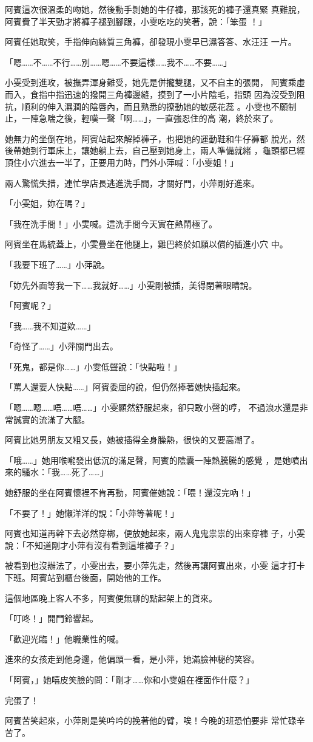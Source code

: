 阿賓這次很溫柔的吻她，然後動手剝她的牛仔褲，那該死的褲子還真緊
真難脫，阿賓費了半天勁才將褲子褪到腳跟，小雯吃吃的笑著，說：「笨蛋
！」

阿賓任她取笑，手指伸向絲質三角褲，卻發現小雯早已濕答答、水汪汪
一片。

「嗯……不……不行……別……嗯……不要這樣……我不……不要……」

小雯受到進攻，被撫弄渾身難受，她先是併攏雙腿，又不自主的張開，
阿賓乘虛而入，食指中指迅速的撥開三角褲邊縫，摸到了一小片陰毛，指頭
因為沒受到阻抗，順利的伸入濕潤的陰唇內，而且熟悉的撩動她的敏感花蕊
。小雯也不願制止，一陣急喘之後，輕嘆一聲「啊……」，一直強忍住的高
潮，終於來了。

她無力的坐倒在地，阿賓站起來解掉褲子，也把她的運動鞋和牛仔褲都
脫光，然後帶她到行軍床上，讓她躺上去，自己壓到她身上，兩人準備就緒
，龜頭都已經頂住小穴進去一半了，正要用力時，門外小萍喊：「小雯姐！」

兩人驚慌失措，連忙學店長逃進洗手間，才關好門，小萍剛好進來。

「小雯姐，妳在嗎？」

「我在洗手間！」小雯喊。這洗手間今天實在熱鬧極了。

阿賓坐在馬統蓋上，小雯疊坐在他腿上，雞巴終於如願以償的插進小穴
中。

「我要下班了……」小萍說。

「妳先外面等我一下……我就好……」小雯剛被插，美得閉著眼睛說。

「阿賓呢？」

「我……我不知道欸……」

「奇怪了……」小萍關門出去。

「死鬼，都是你……」小雯低聲說：「快點啦！」

「罵人還要人快點……」阿賓委屈的說，但仍然捧著她快插起來。

「嗯……嗯……唔……唔……」小雯顯然舒服起來，卻只敢小聲的哼，
不過浪水還是非常誠實的流滿了大腿。

阿賓比她男朋友又粗又長，她被插得全身臊熱，很快的又要高潮了。

「哦……」她用喉嚨發出低沉的滿足聲，阿賓的陰囊一陣熱騰騰的感覺
，是她噴出來的騷水：「我……死了……」

她舒服的坐在阿賓懷裡不肯再動，阿賓催她說：「喂！還沒完吶！」

「不要了！」她懶洋洋的說：「小萍等著呢！」

阿賓也知道再幹下去必然穿梆，便放她起來，兩人鬼鬼祟祟的出來穿褲
子，小雯說：「不知道剛才小萍有沒有看到這堆褲子？」

被看到也沒辦法了，小雯出去，要小萍先走，然後再讓阿賓出來，小雯
這才打卡下班。阿賓站到櫃台後面，開始他的工作。

這個地區晚上客人不多，阿賓便無聊的點起架上的貨來。

「叮咚！」開門鈴響起。

「歡迎光臨！」他職業性的喊。

進來的女孩走到他身邊，他偏頭一看，是小萍，她滿臉神秘的笑容。

「阿賓，」她嘻皮笑臉的問：「剛才……你和小雯姐在裡面作什麼？」

完蛋了！

阿賓苦笑起來，小萍則是笑吟吟的挽著他的臂，唉！今晚的班恐怕要非
常忙碌辛苦了。










